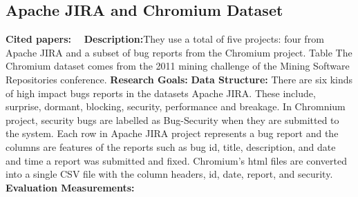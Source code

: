 \subsection{Apache JIRA and Chromium Dataset}
\textbf{Cited papers:}~\cite{peters2018text}~\cite{ohira2015dataset} \newline
\textbf{Description:}They use a total of five projects: four from Apache JIRA and a subset of bug reports from the Chromium project. Table The Chromium dataset comes from the 2011 mining challenge of the Mining Software Repositories conference. \newline
\textbf{Research Goals:}  \newline
\textbf{Data Structure:} There are six kinds of high impact bugs reports in
the datasets Apache JIRA. These include, surprise, dormant, blocking, security, performance and breakage. In Chromnium project, security bugs are labelled as Bug-Security when they are submitted to the system. Each row in Apache JIRA project represents a bug report and the columns are features of the reports such as bug id, title, description, and date and time a report was submitted and fixed. Chromium's html files are converted into a single CSV file with the
column headers, id, date, report, and security.\newline
\textbf{Evaluation Measurements:} \newline

